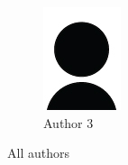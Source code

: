 \begin{figure}
\begin{subfigure}[b]{0.2\textwidth}
        \includegraphics[width=\textwidth]{figs/author}
        \caption{Author 3}
        \label{fig:c1:auth3}
    \end{subfigure}
       \caption{All authors}
       \label{fig:c1:allauthors}
\end{figure}
